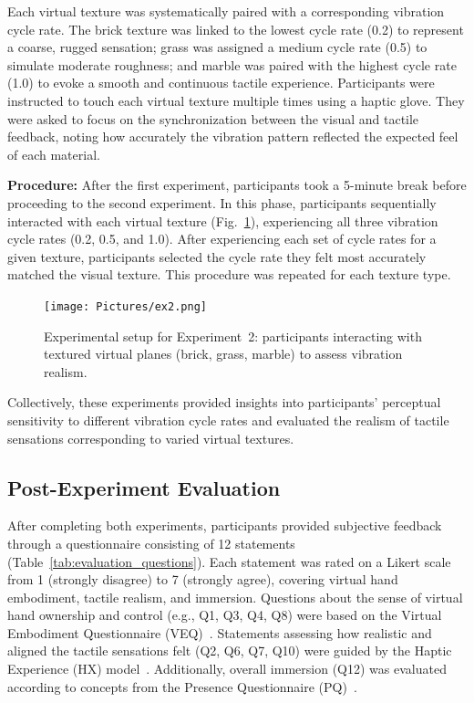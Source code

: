 Each virtual texture was systematically paired with a corresponding vibration cycle rate. The brick texture was linked to the lowest cycle rate (0.2) to represent a coarse, rugged sensation; grass was assigned a medium cycle rate (0.5) to simulate moderate roughness; and marble was paired with the highest cycle rate (1.0) to evoke a smooth and continuous tactile experience. Participants were instructed to touch each virtual texture multiple times using a haptic glove. They were asked to focus on the synchronization between the visual and tactile feedback, noting how accurately the vibration pattern reflected the expected feel of each material.

\textbf{Procedure:} After the first experiment, participants took a 5-minute break before proceeding to the second experiment. In this phase, participants sequentially interacted with each virtual texture (Fig.~\ref{fig:experiment2_setup}), experiencing all three vibration cycle rates (0.2, 0.5, and 1.0). After experiencing each set of cycle rates for a given texture, participants selected the cycle rate they felt most accurately matched the visual texture. This procedure was repeated for each texture type.

\begin{figure}[H]\centering
	\texttt{[image: Pictures/ex2.png]}%
	\caption{Experimental setup for Experiment~2: participants interacting with textured virtual planes (brick, grass, marble) to assess vibration realism.}\label{fig:experiment2_setup}
\end{figure}

Collectively, these experiments provided insights into participants' perceptual sensitivity to different vibration cycle rates and evaluated the realism of tactile sensations corresponding to varied virtual textures.

\newpage
\subsection{Post-Experiment Evaluation}
After completing both experiments, participants provided subjective feedback through a questionnaire consisting of 12 statements (Table~\ref{tab:evaluation_questions}). Each statement was rated on a Likert scale from 1 (strongly disagree) to 7 (strongly agree), covering virtual hand embodiment, tactile realism, and immersion. Questions about the sense of virtual hand ownership and control (e.g., Q1, Q3, Q4, Q8) were based on the Virtual Embodiment Questionnaire (VEQ)~\cite{10.1145/3027063.3053272}. Statements assessing how realistic and aligned the tactile sensations felt (Q2, Q6, Q7, Q10) were guided by the Haptic Experience (HX) model~\cite{10.1016/j.ijhcs.2017.04.004}. Additionally, overall immersion (Q12) was evaluated according to concepts from the Presence Questionnaire (PQ)~\cite{10.1162/105474698565686}.

